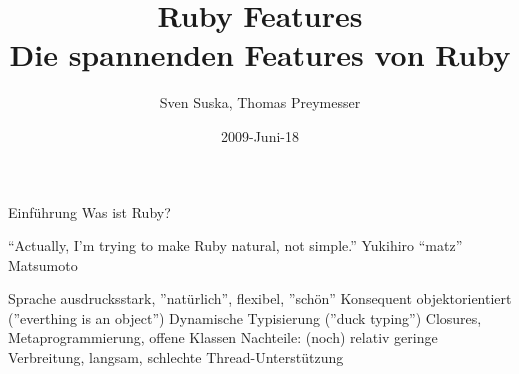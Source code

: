\documentclass{beamer}
\title[Ruby]{Ruby Features\\Die spannenden Features von Ruby}
\author{Sven Suska, Thomas Preymesser}
\date{2009-Juni-18}
\begin{document}
\begin{frame}
\titlepage
\end{frame}


\begin{frame}{Einführung}
Was ist Ruby?

“Actually, I'm trying to make Ruby natural, not simple.”
Yukihiro “matz” Matsumoto

Sprache ausdrucksstark, ”natürlich”, flexibel, ”schön”
Konsequent objektorientiert (”everthing is an object”)
Dynamische Typisierung (”duck typing”)
Closures, Metaprogrammierung, offene Klassen
Nachteile: (noch) relativ geringe Verbreitung, langsam, 
schlechte Thread-Unterstützung

\end{frame}
\end{document}
